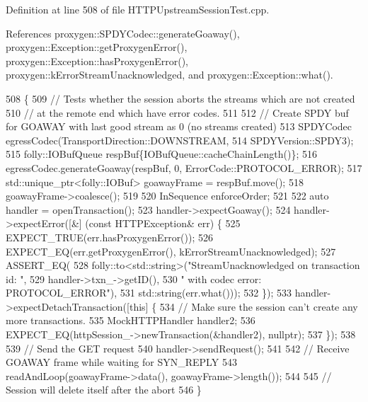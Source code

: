 Definition at line 508 of file H\+T\+T\+P\+Upstream\+Session\+Test.\+cpp.



References proxygen\+::\+S\+P\+D\+Y\+Codec\+::generate\+Goaway(), proxygen\+::\+Exception\+::get\+Proxygen\+Error(), proxygen\+::\+Exception\+::has\+Proxygen\+Error(), proxygen\+::k\+Error\+Stream\+Unacknowledged, and proxygen\+::\+Exception\+::what().


\begin{DoxyCode}
508                                                             \{
509   \textcolor{comment}{// Tests whether the session aborts the streams which are not created}
510   \textcolor{comment}{// at the remote end which have error codes.}
511 
512   \textcolor{comment}{// Create SPDY buf for GOAWAY with last good stream as 0 (no streams created)}
513   SPDYCodec egressCodec(TransportDirection::DOWNSTREAM,
514                         SPDYVersion::SPDY3);
515   folly::IOBufQueue respBuf\{IOBufQueue::cacheChainLength()\};
516   egressCodec.generateGoaway(respBuf, 0, ErrorCode::PROTOCOL\_ERROR);
517   std::unique\_ptr<folly::IOBuf> goawayFrame = respBuf.move();
518   goawayFrame->coalesce();
519 
520   InSequence enforceOrder;
521 
522   \textcolor{keyword}{auto} handler = openTransaction();
523   handler->expectGoaway();
524   handler->expectError([&] (\textcolor{keyword}{const} HTTPException& err) \{
525       EXPECT\_TRUE(err.hasProxygenError());
526       EXPECT\_EQ(err.getProxygenError(), kErrorStreamUnacknowledged);
527       ASSERT\_EQ(
528         folly::to<std::string>(\textcolor{stringliteral}{"StreamUnacknowledged on transaction id: "},
529                                handler->txn\_->getID(),
530                                \textcolor{stringliteral}{" with codec error: PROTOCOL\_ERROR"}),
531         std::string(err.what()));
532     \});
533   handler->expectDetachTransaction([\textcolor{keyword}{this}] \{
534       \textcolor{comment}{// Make sure the session can't create any more transactions.}
535       MockHTTPHandler handler2;
536       EXPECT\_EQ(httpSession\_->newTransaction(&handler2), \textcolor{keyword}{nullptr});
537     \});
538 
539   \textcolor{comment}{// Send the GET request}
540   handler->sendRequest();
541 
542   \textcolor{comment}{// Receive GOAWAY frame while waiting for SYN\_REPLY}
543   readAndLoop(goawayFrame->data(), goawayFrame->length());
544 
545   \textcolor{comment}{// Session will delete itself after the abort}
546 \}
\end{DoxyCode}
